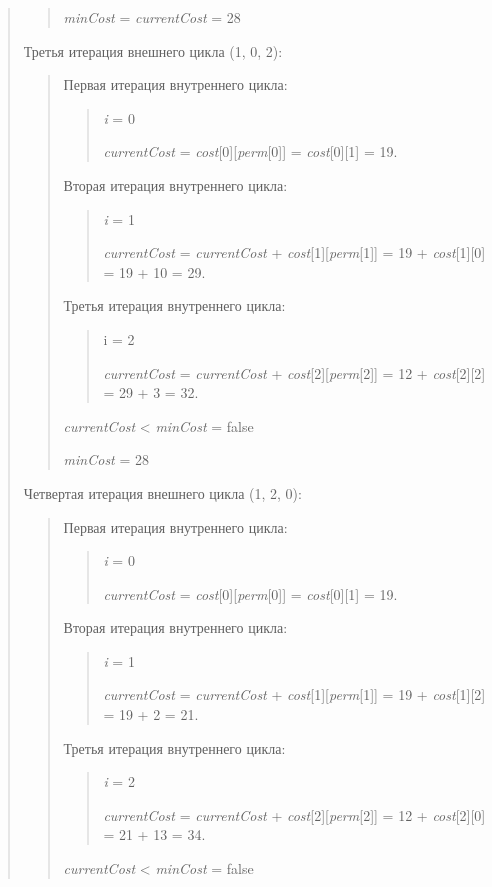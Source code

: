 \documentclass[]{article}
\begin{document}
\begin{quote}
\begin{quote}
\emph{minCost} = \emph{currentCost} = 28
\end{quote}
Третья итерация внешнего цикла (1, 0, 2):
\begin{quote}
Первая итерация внутреннего цикла:

\begin{quote}
\emph{i} = 0

\emph{currentCost} = \emph{cost}{[}0{]}{[}\emph{perm}{[}0{]}{]} =
\emph{cost}{[}0{]}{[}1{]} = 19.

\end{quote}
Вторая итерация внутреннего цикла:
\begin{quote}
\emph{i} = 1

\emph{currentCost} = \emph{currentCost} +
\emph{cost}{[}1{]}{[}\emph{perm}{[}1{]}{]} = 19 +
\emph{cost}{[}1{]}{[}0{]} = 19 + 10 = 29.
\end{quote}
Третья итерация внутреннего цикла:
\begin{quote}
i = 2

\emph{currentCost} = \emph{currentCost} +
\emph{cost}{[}2{]}{[}\emph{perm}{[}2{]}{]} = 12 +
\emph{cost}{[}2{]}{[}2{]} = 29 + 3 = 32.
\end{quote}
\emph{currentCost} \textless{} \emph{minCost} = false

\emph{minCost} = 28
\end{quote}
Четвертая итерация внешнего цикла (1, 2, 0):
\begin{quote}
Первая итерация внутреннего цикла:

\begin{quote}
\emph{i} = 0

\emph{currentCost} = \emph{cost}{[}0{]}{[}\emph{perm}{[}0{]}{]} =
\emph{cost}{[}0{]}{[}1{]} = 19.

\end{quote}
Вторая итерация внутреннего цикла:
\begin{quote}
\emph{i} = 1

\emph{currentCost} = \emph{currentCost} +
\emph{cost}{[}1{]}{[}\emph{perm}{[}1{]}{]} = 19 +
\emph{cost}{[}1{]}{[}2{]} = 19 + 2 = 21.
\end{quote}
Третья итерация внутреннего цикла:
\begin{quote}
\emph{i} = 2

\emph{currentCost} = \emph{currentCost} +
\emph{cost}{[}2{]}{[}\emph{perm}{[}2{]}{]} = 12 +
\emph{cost}{[}2{]}{[}0{]} = 21 + 13 = 34.
\end{quote}
\emph{currentCost} \textless{} \emph{minCost} = false


\end{quote}
\end{quote}
\end{document}
